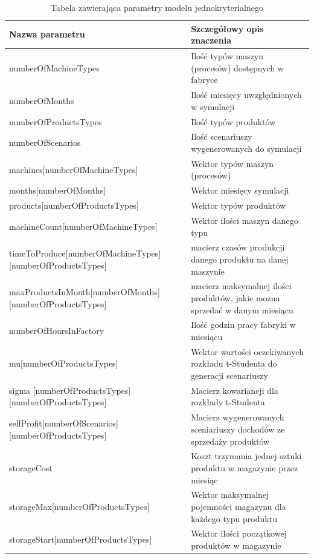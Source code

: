 \documentclass[11pt,a4paper]{article}
\begin{document}
\begin{table}[ht!]
\caption{Tabela zawierająca parametry modelu jednokryterialnego}
\label{tab:param}
\begin{tabular}{lp{9cm}}
    \hline
    Nazwa parametru      & Szczegółowy opis znaczenia \\
    \hline
    numberOfMachineTypes & Ilość typów maszyn (procesów) dostępnych w fabryce \\
numberOfMonths & Ilość miesięcy uwzględnionych w symulacji  \\
numberOfProductsTypes & Ilość typów produktów \\
numberOfScenarios & Ilość scenariuszy wygenerowanych do symulacji \\
machines[numberOfMachineTypes] & Wektor typów maszyn (procesów)\\
months[numberOfMonths] & Wektor miesięcy symulacji\\
products[numberOfProductsTypes] & Wektor typów produktów\\
machineCount[numberOfMachineTypes] & Wektor ilości maszyn danego typu\\
timeToProduce[numberOfMachineTypes][numberOfProductsTypes] & macierz czasów produkcji danego produktu na danej maszynie \\
maxProductsInMonth[numberOfMonths][numberOfProductsTypes] & macierz maksymalnej ilości produktów, jakie można sprzedać w danym miesiącu\\
numberOfHoursInFactory & Ilość godzin pracy fabryki w miesiącu\\
mu[numberOfProductsTypes] & Wektor wartości oczekiwanych rozkładu t-Studenta do generacji scenariuszy\\
sigma [numberOfProductsTypes][numberOfProductsTypes] & Macierz kowariancji dla rozkłady t-Studenta\\ 
sellProfit[numberOfScenarios][numberOfProductsTypes] & Macierz wygenerowanych sceniariuszy dochodów ze sprzedaży produktów\\
storageCost & Koszt trzymania jednej sztuki produktu w magazynie przez miesiąc \\
storageMax[numberOfProductsTypes] & Wektor maksymalnej pojemności magazynu dla każdego typu produktu \\
storageStart[numberOfProductsTypes] & Wektor ilości początkowej produktów w magazynie \\
    \hline
\end{tabular}
\end{table}
\end{document}
